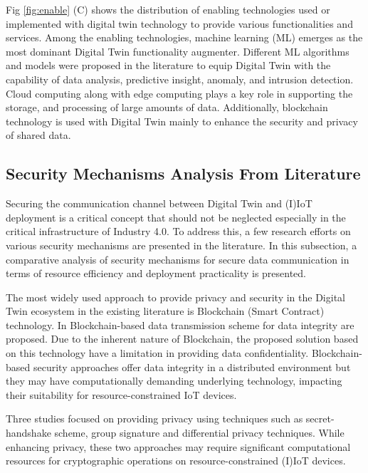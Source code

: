 Fig \ref{fig:enable} (C) shows the distribution of enabling technologies used or implemented with digital twin technology to provide various functionalities and services. Among the enabling technologies, machine learning (ML) emerges as the most dominant Digital Twin functionality augmenter. Different ML algorithms and models were proposed in the literature to equip Digital Twin with the capability of data analysis, predictive insight, anomaly, and intrusion detection. Cloud computing along with edge computing plays a key role in supporting the storage, and processing of large amounts of data. Additionally, blockchain technology is used with Digital Twin mainly to enhance the security and privacy of shared data.


\subsection{Security Mechanisms Analysis From Literature}
Securing the communication channel between Digital Twin and (I)IoT deployment is a critical concept that should not be neglected especially in the critical infrastructure of Industry 4.0. To address this, a few research efforts on various security mechanisms are presented in the literature. In this subsection, a comparative analysis of security mechanisms for secure data communication in terms of resource efficiency and deployment practicality is presented. 

The most widely used approach to provide privacy and security in the Digital Twin ecosystem in the existing literature is Blockchain (Smart Contract) technology. In \cite{kumarBlockchainDeepLearning2022, salimBlockchainEnabledSecureDigital2022, zhengBlockchainBasedTrustworthy2022a, liuBlockchainBasedSecureCommunication2022a, danilczykBlockchainChecksumEstablishing2021a, chenDigitalTwinBasedHeuristic2023a} Blockchain-based data transmission scheme for data integrity are proposed. Due to the inherent nature of Blockchain, the proposed solution based on this technology have a limitation in providing data confidentiality. Blockchain-based security approaches offer data integrity in a distributed environment but they may have computationally demanding underlying technology, impacting their suitability for resource-constrained IoT devices.

Three studies \cite{xuEfficientAuthenticationVehicular2021, wuDeepLearningDriven2022, chengzhelaiSPDTSecurePrivacyPreserving2022, pervezSIGNEDSmartCIty2023a} focused on providing privacy using techniques such as secret-handshake scheme, group signature and differential privacy techniques. While enhancing privacy, these two approaches may require significant computational resources for cryptographic operations on resource-constrained (I)IoT devices.

